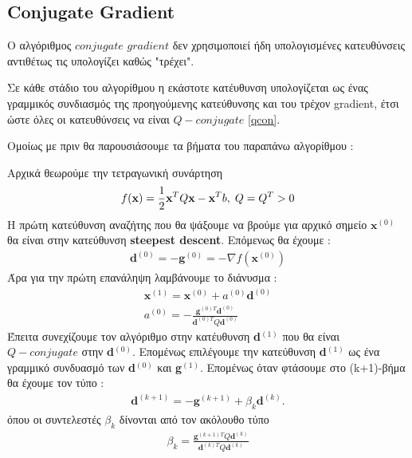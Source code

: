 \documentclass[a4paper,12pt,twoside]{report}
\theoremstyle{plain}
\theoremstyle{definition}
\theoremstyle{remark}
\begin{document}
\subsection{Conjugate Gradient}  
O αλγόριθμος $conjugate$ $gradient$ δεν χρησιμοποιεί ήδη υπολογισμένες κατευθύνσεις αντιθέτως τις υπολογίζει καθώς "τρέχει".

Σε κάθε στάδιο του αλγορίθμου η εκάστοτε κατέυθυνση υπολογίζεται ως ένας γραμμικός συνδιασμός της προηγούμενης κατεύθυνσης και του τρέχον gradient, έτσι ώστε όλες οι κατευθύνσεις να είναι $Q-conjugate$ \ref{qcon}.

Oμοίως με πριν θα παρουσιάσουμε τα βήματα του παραπάνω αλγορίθμου :

Αρχικά θεωρούμε την τετραγωνική συνάρτηση 
\begin{align*}
f(\textbf{x})=\frac{1}{2}\textbf{x}^TQ\textbf{x}-\textbf{x}^Tb, \hspace{0.1cm} Q=Q^T>0
\end{align*}
H πρώτη κατεύθυνση αναζήτης που θα ψάξουμε να βρούμε για αρχικό σημείο $\textbf{x}^{(0)}$ θα είναι στην κατεύθυνση \textbf{steepest descent}. Επόμενως θα έχουμε :
\begin{align}
\textbf{d}^{(0)} = -\textbf{g}^{(0)} = -\nabla f(\textbf{x}^{(0)})
\end{align}
Άρα για την πρώτη επανάληψη λαμβάνουμε το διάνυσμα :
\begin{align}
\textbf{x}^{(1)} = \textbf{x}^{(0)} + a^{(0)}\textbf{d}^{(0)}\\
a^{(0)} = -\frac{\textbf{g}^{(0)T}\textbf{d}^{(0)}}{\textbf{d}^{(0)T}Q\textbf{d}^{(0)}}
\end{align}
Έπειτα συνεχίζουμε τον αλγόριθμο στην κατέυθυνση \textbf{d}$^{(1)}$ που θα είναι $Q-conjugate$ στην \textbf{d}$^{(0)}$. Επομένως επιλέγουμε την κατεύθυνση \textbf{d}$^{(1)}$ ως ένα γραμμικό συνδυασμό των \textbf{d}$^{(0)}$ και \textbf{g}$^{(1)}$. Επομένως όταν φτάσουμε στο (k+1)-βήμα θα έχουμε τον τύπο :
\begin{align}
\textbf{d}^{(k+1)} = -\textbf{g}^{(k+1)} + \beta _k\textbf{d}^{(k)}.
\end{align}
όπου οι συντελεστές $\beta _k$ δίνονται από τον ακόλουθο τύπο
\begin{align}
\beta _k = \frac{\textbf{g}^{(k+1)T}Q\textbf{d}^{(k)}}{\textbf{d}^{(k)T}Q\textbf{d}^{(k)}}
\end{align}
\end{document}
